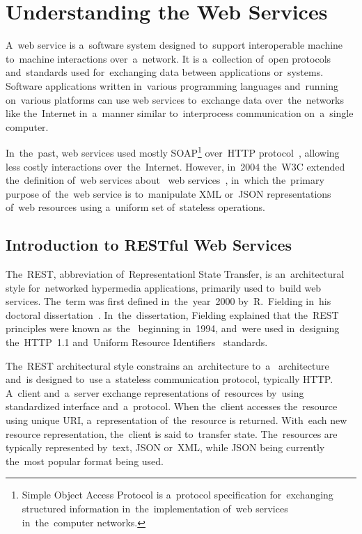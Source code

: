 \section{Understanding the Web Services}
\label{WebServices}
A~web service is a~software system designed to~support interoperable machine
to~machine interactions over~a~network. It is a~collection of~open protocols
and~standards used for~exchanging data between applications or~systems. Software
applications written in~various programming languages and~running on~various
platforms can use web services to~exchange data over~the~networks like
the~Internet in~a~manner similar to~interprocess communication on~a~single
computer.

In~the~past, web services used mostly SOAP\footnote{Simple Object Access
Protocol is a~protocol specification for~exchanging structured information
in~the~implementation of~web services in~the~computer networks.} over~HTTP
protocol~\cite{HTTP}, allowing less costly interactions over~the~Internet.
However, in~2004 the~W3C extended the~definition of~web services
about~ web services~\cite{W3CWebServices}, in~which
the~primary purpose of~the~web service is to~manipulate XML or~JSON
representations of~web resources using a~uniform set of~stateless operations.


\subsection{Introduction to RESTful Web Services}
The~REST, abbreviation of~Representationl State Transfer, is an~architectural
style for~networked hypermedia applications, primarily used to~build web
services. The~term was first defined in~the~year~2000 by~R.~Fielding in~his
doctoral dissertation~\cite{FieldingDissertation}. In~the~dissertation, Fielding
explained that the~REST principles were known as~the~
beginning in~1994, and~were used in~designing the~HTTP~1.1 and~Uniform Resource
Identifiers~\cite{URI-RFC} standards.

The~REST architectural style constrains an~architecture to~a~
architecture and~is designed to~use a~stateless communication protocol,
typically HTTP. A~client and~a~server exchange representations of~resources
by~using standardized interface and~a~protocol. When the~client accesses
the~resource using unique URI, a~representation of~the~resource is returned.
With~each new resource representation, the~client is said to~transfer state.
The~resources are typically represented by~text, JSON or~XML, while JSON being
currently the~most popular format being used.


